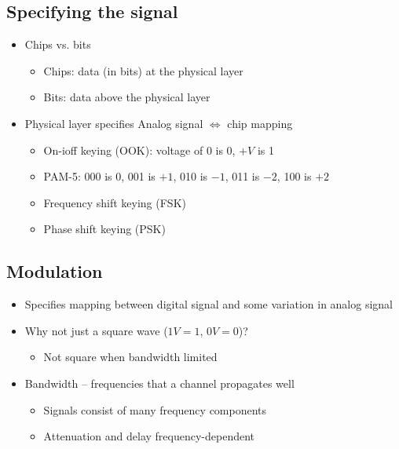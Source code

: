 \subsection{Specifying the signal}
\begin{itemize}[nosep]
    \item Chips vs. bits
          \begin{itemize}[nosep]
              \item Chips: data (in bits) at the physical layer
              \item Bits: data above the physical layer
          \end{itemize}
    \item Physical layer specifies Analog signal $\Leftrightarrow$ chip mapping
          \begin{itemize}[nosep]
              \item On-ioff keying (OOK): voltage of 0 is 0, $+V$ is 1
              \item PAM-5: 000 is 0, 001 is $+1$, 010 is $-1$, 011 is $-2$, 100 is $+2$
              \item Frequency shift keying (FSK)
              \item Phase shift keying (PSK)
          \end{itemize}
\end{itemize}

\subsection{Modulation}
\begin{itemize}[nosep]
    \item Specifies mapping between digital signal and some variation in analog signal
    \item Why not just a square wave ($1V=1$, $0V=0$)?
          \begin{itemize}[nosep]
              \item Not square when bandwidth limited
          \end{itemize}
    \item Bandwidth -- frequencies that a channel propagates well
          \begin{itemize}[nosep]
              \item Signals consist of many frequency components
              \item Attenuation and delay frequency-dependent
          \end{itemize}
\end{itemize}

